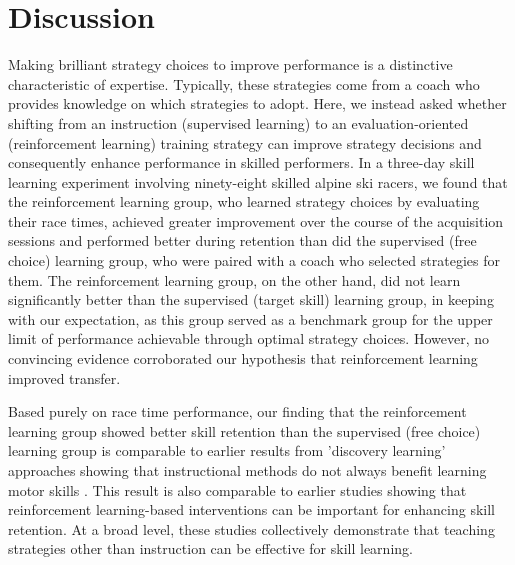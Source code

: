 \documentclass[pdflatex,sn-mathphys-num]{sn-jnl}%
\theoremstyle{thmstyleone}%
\theoremstyle{thmstyletwo}%
\theoremstyle{thmstylethree}%
\begin{document}
\section{Discussion}
Making brilliant strategy choices to improve performance is a distinctive characteristic of expertise. Typically, these strategies come from a coach who provides knowledge on which strategies to adopt. Here, we instead asked whether shifting from an instruction (supervised learning) to an evaluation-oriented (reinforcement learning) training strategy can improve strategy decisions and consequently enhance performance in skilled performers. In a three-day skill learning experiment involving ninety-eight skilled alpine ski racers, we found that the reinforcement learning group, who learned strategy choices by evaluating their race times, achieved greater improvement over the course of the acquisition sessions and performed better during retention than did the supervised (free choice) learning group, who were paired with a coach who selected strategies for them. The reinforcement learning group, on the other hand, did not learn significantly better than the supervised (target skill) learning group, in keeping with our expectation, as this group served as a benchmark group for the upper limit of performance achievable through optimal strategy choices. However, no convincing evidence corroborated our hypothesis that reinforcement learning improved transfer.

Based purely on race time performance, our finding that the reinforcement learning group showed better skill retention than the supervised (free choice) learning group is comparable to earlier results from 'discovery learning' approaches showing that instructional methods do not always benefit learning motor skills \cite{wulf_instructions_1997, hodges_learning_2001, hodges_role_1999}. This result is also comparable to earlier studies showing that reinforcement learning-based interventions can be important for enhancing skill retention\cite{therrien_effective_2016, truong_error-based_2023, hasson_reinforcement_2015, lior_shmuelof_overcoming_2012}. At a broad level, these studies collectively demonstrate that teaching strategies other than instruction can be effective for skill learning.
\end{document}
